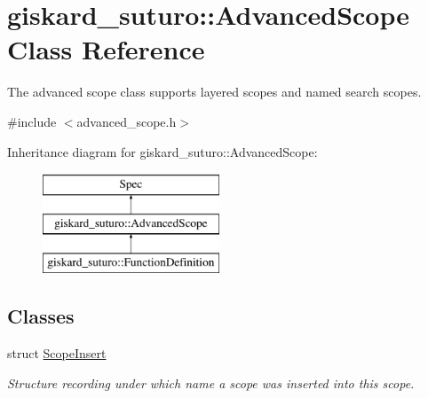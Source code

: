 \hypertarget{classgiskard__suturo_1_1AdvancedScope}{\section{giskard\-\_\-suturo\-:\-:Advanced\-Scope Class Reference}
\label{classgiskard__suturo_1_1AdvancedScope}
}


The advanced scope class supports layered scopes and named search scopes.  




{\ttfamily \#include $<$advanced\-\_\-scope.\-h$>$}

Inheritance diagram for giskard\-\_\-suturo\-:\-:Advanced\-Scope\-:\begin{figure}[H]
\begin{center}
\leavevmode
\includegraphics[height=3.000000cm]{classgiskard__suturo_1_1AdvancedScope}
\end{center}
\end{figure}
\subsection*{Classes}
\begin{DoxyCompactItemize}
\item 
struct \hyperlink{structgiskard__suturo_1_1AdvancedScope_1_1ScopeInsert}{Scope\-Insert}
\begin{DoxyCompactList}\small\item\em Structure recording under which name a scope was inserted into this scope. \end{DoxyCompactList}\end{DoxyCompactItemize}
